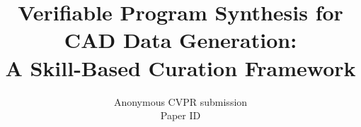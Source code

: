 \documentclass[10pt,twocolumn,letterpaper]{article}
\title{Verifiable Program Synthesis for CAD Data Generation: \\ A Skill-Based Curation Framework}
\author{Anonymous CVPR submission\\
Paper ID \paperID}
\begin{document}
\maketitle







{
    \small
    
    
}
\end{document}
